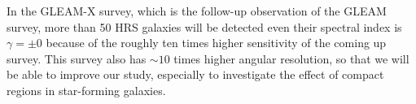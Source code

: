 In the GLEAM-X survey, which is the follow-up observation of the GLEAM survey, more than 50 HRS galaxies will be detected even their spectral index is $\gamma = \pm 0$ because of the roughly ten times higher sensitivity of the coming up survey.
This survey also has $\sim 10$ times higher angular resolution, so that we will be able to improve our study, especially to investigate the effect of compact regions in star-forming galaxies.



%
%

